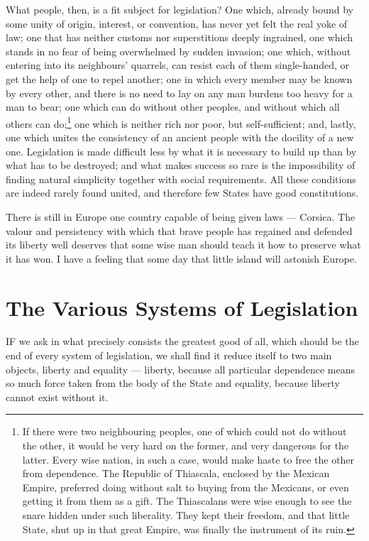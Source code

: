 \documentclass[12pt]{book}
\begin{document}
What people, then, is a fit subject for legislation? One which, already bound by some unity of origin, interest, or convention, has never yet felt the real yoke of law; one that has neither customs nor superstitions deeply ingrained, one which stands in no fear of being overwhelmed by sudden invasion; one which, without entering into its neighbours' quarrels, can resist each of them single-handed, or get the help of one to repel another; one in which every member may be known by every other, and there is no need to lay on any man burdens too heavy for a man to bear; one which can do without other peoples, and without which all others can do;\footnote{ If there were two neighbouring peoples, one of which could not do without the other, it would be very hard on the former, and very dangerous for the latter. Every wise nation, in such a case, would make haste to free the other from dependence. The Republic of Thiascala, enclosed by the Mexican Empire, preferred doing without salt to buying from the Mexicans, or even getting it from them as a gift. The Thiascalans were wise enough to see the snare hidden under such liberality. They kept their freedom, and that little State, shut up in that great Empire, was finally the instrument of its ruin.} one which is neither rich nor poor, but self-sufficient; and, lastly, one which unites the consistency of an ancient people with the docility of a new one. Legislation is made difficult less by what it is necessary to build up than by what has to be destroyed; and what makes success so rare is the impossibility of finding natural simplicity together with social requirements. All these conditions are indeed rarely found united, and therefore few States have good constitutions.

There is still in Europe one country capable of being given laws — Corsica. The valour and persistency with which that brave people has regained and defended its liberty well deserves that some wise man should teach it how to preserve what it has won. I have a feeling that some day that little island will astonish Europe.

\section{The Various Systems of Legislation}
IF we ask in what precisely consists the greatest good of all, which should be the end of every system of legislation, we shall find it reduce itself to two main objects, liberty and equality — liberty, because all particular dependence means so much force taken from the body of the State and equality, because liberty cannot exist without it.
\end{document}

